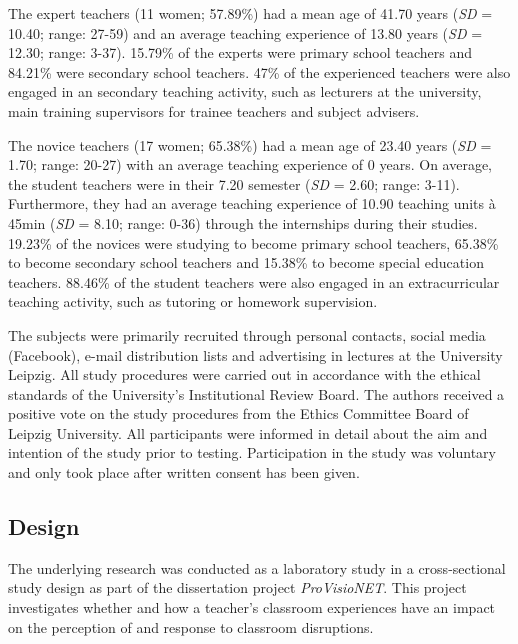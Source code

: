 \documentclass[
  man]{apa6}
\begin{document}
The expert teachers (11 women; 57.89\%) had a mean age of 41.70 years (\emph{SD} = 10.40; range: 27-59) and an average teaching experience of 13.80 years (\emph{SD} = 12.30; range: 3-37).
15.79\% of the experts were primary school teachers and 84.21\% were secondary school teachers. 47\% of the experienced teachers were also engaged in an secondary teaching activity, such as lecturers at the university, main training supervisors for trainee teachers and subject advisers.

The novice teachers (17 women; 65.38\%) had a mean age of 23.40 years (\emph{SD} = 1.70; range: 20-27) with an average teaching experience of 0 years. On average, the student teachers were in their 7.20 semester (\emph{SD} = 2.60; range: 3-11). Furthermore, they had an average teaching experience of 10.90 teaching units à 45min (\emph{SD} = 8.10; range: 0-36) through the internships during their studies.
19.23\% of the novices were studying to become primary school teachers, 65.38\% to become secondary school teachers and 15.38\% to become special education teachers. 88.46\% of the student teachers were also engaged in an extracurricular teaching activity, such as tutoring or homework supervision.

The subjects were primarily recruited through personal contacts, social media (Facebook), e-mail distribution lists and advertising in lectures at the University Leipzig. All study procedures were carried out in accordance with the ethical standards of the University's Institutional Review Board. The authors received a positive vote on the study procedures from the Ethics Committee Board of Leipzig University. All participants were informed in detail about the aim and intention of the study prior to testing. Participation in the study was voluntary and only took place after written consent has been given.

\hypertarget{design}{%
\subsection{Design}\label{design}}

The underlying research was conducted as a laboratory study in a cross-sectional study design as part of the dissertation project \emph{ProVisioNET}. This project investigates whether and how a teacher's classroom experiences have an impact on the perception of and response to classroom disruptions.
\end{document}

